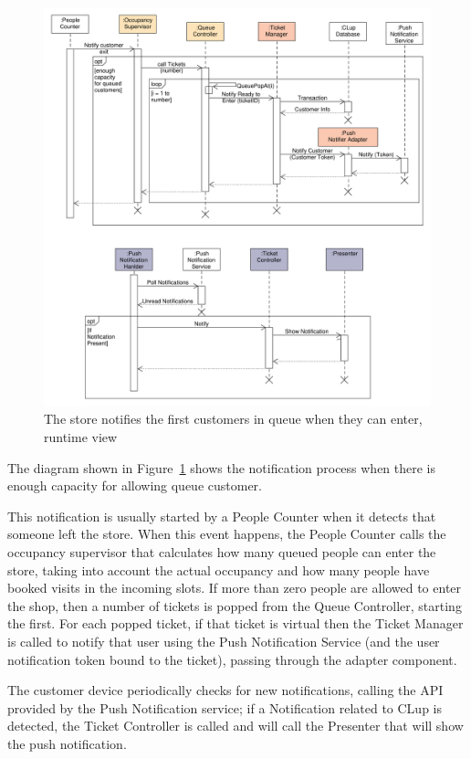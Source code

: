\begin{figure}[H]
    \vspace{-2cm}
    \includegraphics[width=\textwidth]{Images/UML_notification_sequence.pdf}
    \caption{\label{fig:UML_notification_sequence}The store notifies the first customers in queue when they can enter, runtime view}
\end{figure}
The diagram shown in Figure~\ref{fig:UML_notification_sequence} shows the notification process when there is enough capacity for allowing queue customer.

This notification is usually started by a People Counter when it detects that someone left the store. When this event happens, the People Counter calls the occupancy supervisor that calculates how many queued people can enter the store, taking into account the actual occupancy and how many people have booked visits in the incoming slots. If more than zero people are allowed to enter the shop, then a number of tickets is popped from the Queue Controller, starting the first. For each popped ticket, if that ticket is virtual then the Ticket Manager is called to notify that user using the Push Notification Service (and the user notification token bound to the ticket), passing through the adapter component.

The customer device periodically checks for new notifications, calling the API provided by the Push Notification service; if a Notification related to CLup is detected, the Ticket Controller is called and will call the Presenter that will show the push notification.

